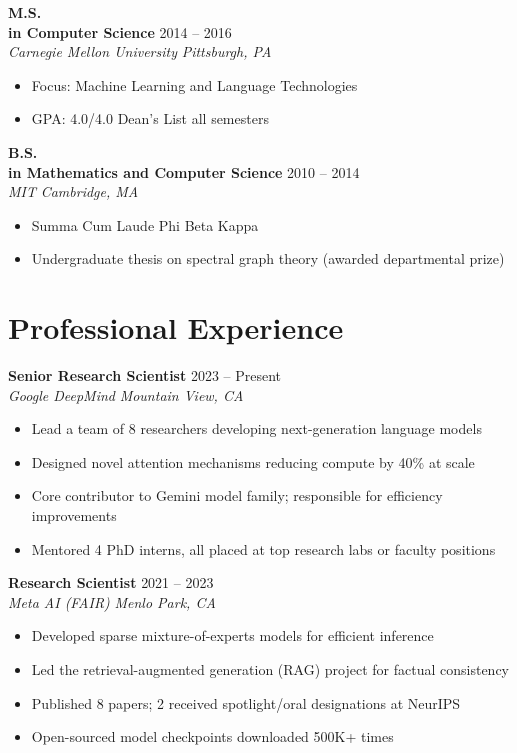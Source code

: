 \documentclass[11pt,a4paper]{article}
\newcommand{\cventry}[4]{%
  \textbf{#1} \hfill {\color{lightgray}#2}\\
  {\color{accent}\textit{#3}} \hfill {\color{lightgray}\textit{#4}}\\[2pt]
}
\newcommand{\cvsep}{\vspace{6pt}}
\begin{document}
\cvsep

\cventry{M.S.\\ in Computer Science}{2014 -- 2016}{Carnegie Mellon University}{Pittsburgh, PA}
\begin{itemize}[leftmargin=1.5em, nosep, itemsep=2pt]
  \item Focus: Machine Learning and Language Technologies
  \item GPA: 4.0/4.0 \quad Dean's List all semesters
\end{itemize}

\cvsep

\cventry{B.S.\\ in Mathematics and Computer Science}{2010 -- 2014}{MIT}{Cambridge, MA}
\begin{itemize}[leftmargin=1.5em, nosep, itemsep=2pt]
  \item Summa Cum Laude \quad Phi Beta Kappa
  \item Undergraduate thesis on spectral graph theory (awarded departmental prize)
\end{itemize}

\section{Professional Experience}

\cventry{Senior Research Scientist}{2023 -- Present}{Google DeepMind}{Mountain View, CA}
\begin{itemize}[leftmargin=1.5em, nosep, itemsep=2pt]
  \item Lead a team of 8 researchers developing next-generation language models
  \item Designed novel attention mechanisms reducing compute by 40\% at scale
  \item Core contributor to Gemini model family; responsible for efficiency improvements
  \item Mentored 4 PhD interns, all placed at top research labs or faculty positions
\end{itemize}

\cvsep

\cventry{Research Scientist}{2021 -- 2023}{Meta AI (FAIR)}{Menlo Park, CA}
\begin{itemize}[leftmargin=1.5em, nosep, itemsep=2pt]
  \item Developed sparse mixture-of-experts models for efficient inference
  \item Led the retrieval-augmented generation (RAG) project for factual consistency
  \item Published 8 papers; 2 received spotlight/oral designations at NeurIPS
  \item Open-sourced model checkpoints downloaded 500K+ times
\end{itemize}
\end{document}
